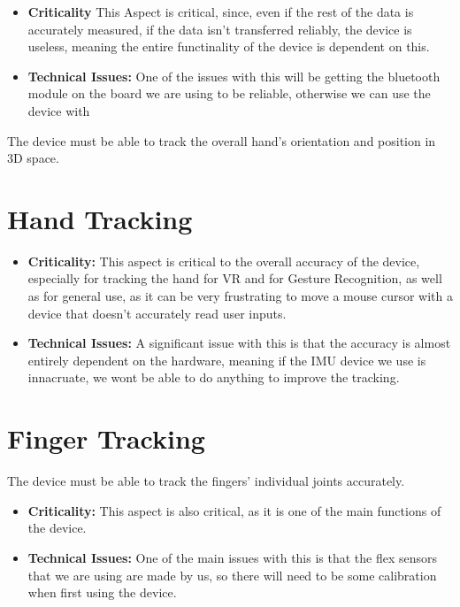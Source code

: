 \documentclass[12pt,a4paper,oneside]{book}
\theoremstyle{plain}
\numberwithin{equation}{chapter}
\newcounter{Secnum}
\begin{document}
\begin{itemize}
    \item \textbf{Criticality} This Aspect is critical, since, even if the rest of the data is accurately measured, if the data isn't transferred reliably, the device is useless, meaning the entire functinality of the device is dependent on this.
    \item \textbf{Technical Issues:} One of the issues with this will be getting the bluetooth module on the board we are using to be reliable, otherwise we can use the device with
\end{itemize}

\noindent The device must be able to track the overall hand's orientation and position in 3D space.

\section{\textbf{Hand Tracking}}

\begin{itemize}
    \item \textbf{Criticality:} This aspect is critical to the overall accuracy of the device, especially for tracking the hand for VR and for Gesture Recognition, as well as for general use, as it can be very frustrating to move a mouse cursor with a device that doesn't accurately read user inputs.
    \item \textbf{Technical Issues:} A significant issue with this is that the accuracy is almost entirely dependent on the hardware, meaning if the IMU device we use is innacruate, we wont be able to do anything to improve the tracking.
\end{itemize}


\section{\textbf{Finger Tracking}}

\noindent The device must be able to track the fingers' individual joints accurately.

\begin{itemize}
    \item \textbf{Criticality:} This aspect is also critical, as it is one of the main functions of the device.
    \item \textbf{Technical Issues:} One of the main issues with this is that the flex sensors that we are using are made by us, so there will need to be some calibration when first using the device.
\end{itemize}
\end{document}
